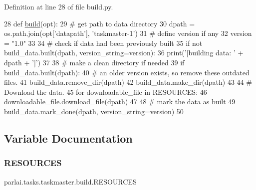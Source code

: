 Definition at line 28 of file build.\+py.


\begin{DoxyCode}
28 \textcolor{keyword}{def }\hyperlink{namespacedialog__babi__feedback_1_1build_a7a9d289f7493a5ded13c4b7f071b6184}{build}(opt):
29     \textcolor{comment}{# get path to data directory}
30     dpath = os.path.join(opt[\textcolor{stringliteral}{'datapath'}], \textcolor{stringliteral}{'taskmaster-1'})
31     \textcolor{comment}{# define version if any}
32     version = \textcolor{stringliteral}{"1.0"}
33 
34     \textcolor{comment}{# check if data had been previously built}
35     \textcolor{keywordflow}{if} \textcolor{keywordflow}{not} build\_data.built(dpath, version\_string=version):
36         print(\textcolor{stringliteral}{'[building data: '} + dpath + \textcolor{stringliteral}{']'})
37 
38         \textcolor{comment}{# make a clean directory if needed}
39         \textcolor{keywordflow}{if} build\_data.built(dpath):
40             \textcolor{comment}{# an older version exists, so remove these outdated files.}
41             build\_data.remove\_dir(dpath)
42         build\_data.make\_dir(dpath)
43 
44         \textcolor{comment}{# Download the data.}
45         \textcolor{keywordflow}{for} downloadable\_file \textcolor{keywordflow}{in} RESOURCES:
46             downloadable\_file.download\_file(dpath)
47 
48         \textcolor{comment}{# mark the data as built}
49         build\_data.mark\_done(dpath, version\_string=version)
50 \end{DoxyCode}


\subsection{Variable Documentation}
\mbox{\label{namespaceparlai_1_1tasks_1_1taskmaster_1_1build_ab4e1e1aa4bfa24c0ffbafacab10c4da3}} 
\subsubsection{\texorpdfstring{R\+E\+S\+O\+U\+R\+C\+ES}{RESOURCES}}
{\footnotesize\ttfamily parlai.\+tasks.\+taskmaster.\+build.\+R\+E\+S\+O\+U\+R\+C\+ES}



